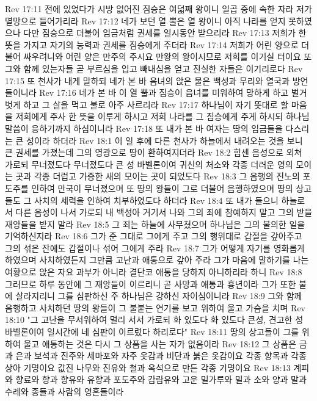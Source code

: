 Rev 17:11  전에 있었다가 시방 없어진 짐승은 여덟째 왕이니 일곱 중에 속한 자라 저가 멸망으로 들어가리라
Rev 17:12  네가 보던 열 뿔은 열 왕이니 아직 나라를 얻지 못하였으나 다만 짐승으로 더불어 임금처럼 권세를 일시동안 받으리라
Rev 17:13  저희가 한 뜻을 가지고 자기의 능력과 권세를 짐승에게 주더라
Rev 17:14  저희가 어린 양으로 더불어 싸우려니와 어린 양은 만주의 주시요 만왕의 왕이시므로 저희를 이기실 터이요 또 그와 함께 있는자들 곧 부르심을 입고 빼내심을 얻고 진실한 자들은 이기리로다
Rev 17:15  또 천사가 내게 말하되 네가 본 바 음녀의 앉은 물은 백성과 무리와 열국과 방언들이니라
Rev 17:16  네가 본 바 이 열 뿔과 짐승이 음녀를 미워하여 망하게 하고 벌거벗게 하고 그 살을 먹고 불로 아주 사르리라
Rev 17:17  하나님이 자기 뜻대로 할 마음을 저희에게 주사 한 뜻을 이루게 하시고 저희 나라를 그 짐승에게 주게 하시되 하나님 말씀이 응하기까지 하심이니라
Rev 17:18  또 내가 본 바 여자는 땅의 임금들을 다스리는 큰 성이라 하더라
Rev 18:1  이 일 후에 다른 천사가 하늘에서 내려오는 것을 보니 큰 권세를 가졌는데 그의 영광으로 땅이 환하여지더라
Rev 18:2  힘센 음성으로 외쳐 가로되 무너졌도다 무너졌도다 큰 성 바벨론이여 귀신의 처소와 각종 더러운 영의 모이는 곳과 각종 더럽고 가증한 새의 모이는 곳이 되었도다
Rev 18:3  그 음행의 진노의 포도주를 인하여 만국이 무너졌으며 또 땅의 왕들이 그로 더불어 음행하였으며 땅의 상고들도 그 사치의 세력을 인하여 치부하였도다 하더라
Rev 18:4  또 내가 들으니 하늘로서 다른 음성이 나서 가로되 내 백성아 거기서 나와 그의 죄에 참예하지 말고 그의 받을 재앙들을 받지 말라
Rev 18:5  그 죄는 하늘에 사무쳤으며 하나님은 그의 불의한 일을 기억하신지라
Rev 18:6  그가 준 그대로 그에게 주고 그의 행위대로 갑절을 갚아주고 그의 섞은 잔에도 갑절이나 섞어 그에게 주라
Rev 18:7  그가 어떻게 자기를 영화롭게 하였으며 사치하였든지 그만큼 고난과 애통으로 갚아 주라 그가 마음에 말하기를 나는 여황으로 앉은 자요 과부가 아니라 결단코 애통을 당하지 아니하리라 하니
Rev 18:8  그러므로 하루 동안에 그 재앙들이 이르리니 곧 사망과 애통과 흉년이라 그가 또한 불에 살라지리니 그를 심판하신 주 하나님은 강하신 자이심이니라
Rev 18:9  그와 함께 음행하고 사치하던 땅의 왕들이 그 불붙는 연기를 보고 위하여 울고 가슴을 치며
Rev 18:10  "그 고난을 무서워하여 멀리 서서 가로되 화 있도다 화 있도다 큰성, 견고한 성 바벨론이여 일시간에 네 심판이 이르렀다 하리로다"
Rev 18:11  땅의 상고들이 그를 위하여 울고 애통하는 것은 다시 그 상품을 사는 자가 없음이라
Rev 18:12  그 상품은 금과 은과 보석과 진주와 세마포와 자주 옷감과 비단과 붉은 옷감이요 각종 향목과 각종 상아 기명이요 값진 나무와 진유와 철과 옥석으로 만든 각종 기명이요
Rev 18:13  계피와 향료와 향과 향유와 유향과 포도주와 감람유와 고운 밀가루와 밀과 소와 양과 말과 수레와 종들과 사람의 영혼들이라
